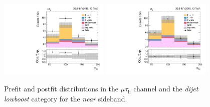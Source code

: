\begin{figure}[h!]
    \centering
    \includegraphics[width=0.47\textwidth]{Figures/background_estimation/RQCDOSSS/Postfit/mt_dijet2D_lowboost_antiiso_near/prefit_mt_dijet2D_lowboost_antiiso_near.pdf}
    \includegraphics[width=0.47\textwidth]{Figures/background_estimation/RQCDOSSS/Postfit/mt_dijet2D_lowboost_antiiso_near/postfit_mt_dijet2D_lowboost_antiiso_near.pdf}
     \caption[Prefit and Postfit distributions in the $\mu\tau_\text{h}$ channel for the \textit{near} sideband in the \textit{dijet lowboost} category.]{Prefit and postfit distributions in the $\mu\tau_\text{h}$ channel and the \textit{dijet lowboost} category for the \textit{near} sideband.}\label{fig:etmtqcd:mt_prefitpostfit_lowboost_near}
\end{figure}%
